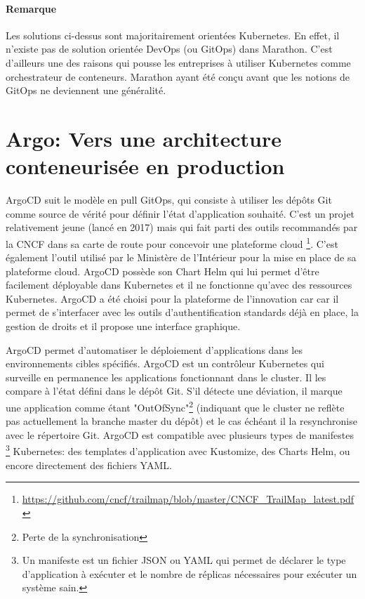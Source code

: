 \documentclass[11pt,fleqn]{book} %
\begin{document}
\begin{interrupt}
\paragraph{Remarque}
Les solutions ci-dessus sont majoritairement orientées Kubernetes. En effet, il n'existe pas de solution orientée DevOps (ou GitOps) dans Marathon. C'est d'ailleurs une des raisons qui pousse les entreprises à utiliser Kubernetes comme orchestrateur de conteneurs. Marathon ayant été conçu avant que les notions de GitOps ne deviennent une généralité.
\end{interrupt}
\section{Argo: Vers une architecture conteneurisée en production}

ArgoCD suit le modèle en pull GitOps, qui consiste à utiliser les dépôts Git comme source de vérité pour définir l'état d'application souhaité. C'est un projet relativement jeune (lancé en 2017) mais qui fait parti des outils recommandés par la CNCF dans sa carte de route pour concevoir une plateforme cloud \footnote{\url{https://github.com/cncf/trailmap/blob/master/CNCF_TrailMap_latest.pdf}}. C'est également l'outil utilisé par le Ministère de l'Intérieur pour la mise en place de sa plateforme cloud.  ArgoCD possède son Chart Helm qui lui permet d'être facilement déployable dans Kubernetes et il ne fonctionne qu'avec des ressources Kubernetes. ArgoCD a été choisi pour la plateforme de l'innovation car car il permet de s'interfacer avec les outils d'authentification standards déjà en place, la gestion de droits et il propose une interface graphique. \newline

ArgoCD permet d'automatiser le déploiement d'applications dans les environnements cibles spécifiés. ArgoCD est un contrôleur Kubernetes qui surveille en permanence les applications fonctionnant dans le cluster. Il les compare à l'état défini dans le dépôt Git. S'il détecte une déviation, il marque une application comme étant "OutOfSync"\footnote{Perte de la synchronisation} (indiquant que le cluster ne reflète pas actuellement la branche master du dépôt) et le cas échéant il la resynchronise avec le répertoire Git.  ArgoCD est compatible avec plusieurs types de manifestes \footnote{Un manifeste est un fichier JSON ou YAML qui permet de déclarer le type d'application à exécuter et le nombre de réplicas nécessaires pour exécuter un système sain.} Kubernetes: des templates d'application avec Kustomize, des Charts Helm, ou encore directement des fichiers YAML.\newline
\end{document}

